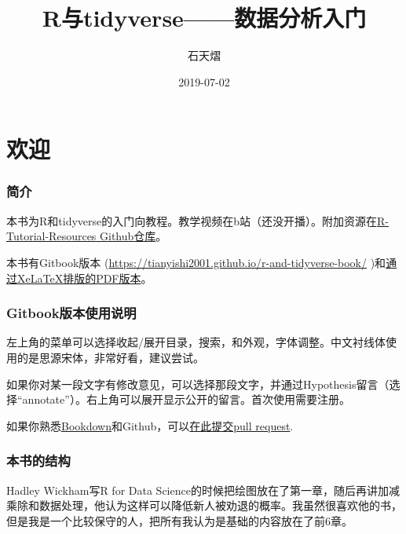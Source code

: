 \documentclass[]{book}
\title{R与tidyverse------数据分析入门}
\author{石天熠}
\date{2019-07-02}
\begin{document}
\maketitle

{
\setcounter{tocdepth}{1}
\tableofcontents
}
\hypertarget{welcome}{%
\chapter*{欢迎}\label{welcome}}

\hypertarget{ux7b80ux4ecb}{%
\subsection*{简介}\label{ux7b80ux4ecb}}

本书为R和tidyverse的入门向教程。教学视频在b站（还没开播）。附加资源在\href{https://github.com/TianyiShi2001/R-Tutorial-Resorces}{R-Tutorial-Resources Github仓库}。

本书有Gitbook版本 (\url{https://tianyishi2001.github.io/r-and-tidyverse-book/} )和\href{https://tianyishi2001.github.io/r-and-tidyverse-book/R与tidyverse——数据分析入门.pdf}{通过XeLaTeX排版的PDF版本}。

\hypertarget{ux8bf4ux660e}{%
\subsection*{Gitbook版本使用说明}\label{ux8bf4ux660e}}

左上角的菜单可以选择收起/展开目录，搜索，和外观，字体调整。中文衬线体使用的是思源宋体，非常好看，建议尝试。

如果你对某一段文字有修改意见，可以选择那段文字，并通过Hypothesis留言（选择``annotate''）。右上角可以展开显示公开的留言。首次使用需要注册。

如果你熟悉\href{https://bookdown.org}{Bookdown}和Github，可以\href{https://github.com/TianyiShi2001/r-and-tidyverse-book}{在此提交pull request}.

\subsection*{本书的结构}

Hadley Wickham写R for Data Science的时候把绘图放在了第一章，随后再讲加减乘除和数据处理，他认为这样可以降低新人被劝退的概率。我虽然很喜欢他的书，但是我是一个比较保守的人，把所有我认为是基础的内容放在了前6章。
\end{document}
